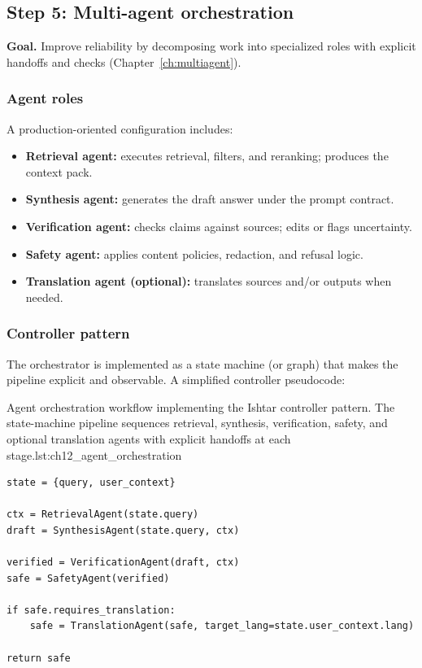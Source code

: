 \subsection{Step 5: Multi-agent orchestration}
\label{sec:ishtar-step-agents}

\textbf{Goal.} Improve reliability by decomposing work into specialized roles with explicit handoffs and checks (Chapter~\ref{ch:multiagent}).

\subsubsection{Agent roles}
A production-oriented configuration includes:
\begin{itemize}
    \item \textbf{Retrieval agent:} executes retrieval, filters, and reranking; produces the context pack.
    \item \textbf{Synthesis agent:} generates the draft answer under the prompt contract.
    \item \textbf{Verification agent:} checks claims against sources; edits or flags uncertainty.
    \item \textbf{Safety agent:} applies content policies, redaction, and refusal logic.
    \item \textbf{Translation agent (optional):} translates sources and/or outputs when needed.
\end{itemize}

\subsubsection{Controller pattern}
The orchestrator is implemented as a state machine (or graph) that makes the pipeline explicit and observable.
A simplified controller pseudocode:

\begin{codebox}{Agent orchestration workflow implementing the Ishtar controller pattern. The state-machine pipeline sequences retrieval, synthesis, verification, safety, and optional translation agents with explicit handoffs at each stage.}{lst:ch12_agent_orchestration}
\begin{verbatim}
state = {query, user_context}

ctx = RetrievalAgent(state.query)
draft = SynthesisAgent(state.query, ctx)

verified = VerificationAgent(draft, ctx)
safe = SafetyAgent(verified)

if safe.requires_translation:
    safe = TranslationAgent(safe, target_lang=state.user_context.lang)

return safe
\end{verbatim}
\end{codebox}

